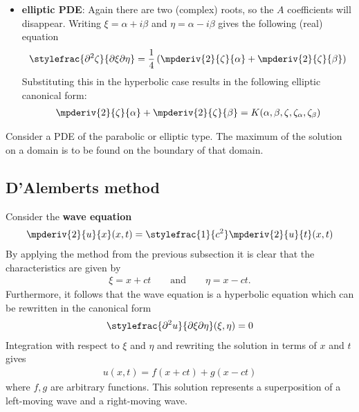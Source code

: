 {\begin{itemize}
			\item \textbf{elliptic PDE}: Again there are two (complex) roots, so the $A$ coefficients will disappear. Writing $\xi = \alpha + i\beta$ and $\eta = \alpha - i\beta$ gives the following (real) equation \[\stylefrac{\partial^2\zeta}{\partial\xi\partial\eta} = \frac{1}{4}\left(\mpderiv{2}{\zeta}{\alpha} + \mpderiv{2}{\zeta}{\beta}\right)\] Substituting this in the hyperbolic case results in the following elliptic canonical form:
				\begin{gather}
					\label{pde:elliptic_canonical_form}
					\mpderiv{2}{\zeta}{\alpha} + \mpderiv{2}{\zeta}{\beta} = K(\alpha,\beta,\zeta,\zeta_\alpha,\zeta_\beta)
				\end{gather}
		\end{itemize}
	}

	\begin{theorem}\label{pde:theorem:maximum_principle}
		Consider a PDE of the parabolic or elliptic type. The maximum of the solution on a domain is to be found on the boundary of that domain. 
	\end{theorem}

\subsection{D'Alemberts method}

	Consider the \textbf{wave equation}
	\begin{gather}
	    	\label{pde:wave_equation}
		\mpderiv{2}{u}{x}(x, t) = \stylefrac{1}{c^2}\mpderiv{2}{u}{t}(x, t)
	\end{gather}
	By applying the method from the previous subsection it is clear that the characteristics are given by
	\begin{gather}
		\xi = x + ct\qquad\text{and}\qquad \eta = x - ct.
	\end{gather}
	Furthermore, it follows that the wave equation is a hyperbolic equation which can be rewritten in the canonical form
	\begin{gather}
		\label{pde:canonical_wave_equation}
        	\stylefrac{\partial^2u}{\partial\xi\partial\eta}(\xi,\eta) = 0
	\end{gather}
	Integration with respect to $\xi$ and $\eta$ and rewriting the solution in terms of $x$ and $t$ gives
	\begin{gather}
    		\label{pde:wave_solution}
		u(x, t) = f(x+ct) + g(x-ct)
	\end{gather}
	where $f, g$ are arbitrary functions. This solution represents a superposition of a left-moving wave and a right-moving wave.
    
